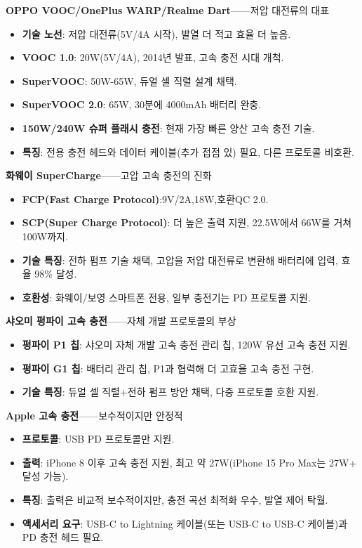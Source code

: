 \textbf{OPPO VOOC/OnePlus WARP/Realme Dart}——저압 대전류의 대표

\begin{itemize}
  \item \textbf{기술 노선}: 저압 대전류(5V/4A 시작), 발열 더 적고 효율 더 높음.
  \item \textbf{VOOC 1.0}: 20W(5V/4A), 2014년 발표, 고속 충전 시대 개척.
  \item \textbf{SuperVOOC}: 50W-65W, 듀얼 셀 직렬 설계 채택.
  \item \textbf{SuperVOOC 2.0}: 65W, 30분에 4000mAh 배터리 완충.
  \item \textbf{150W/240W 슈퍼 플래시 충전}: 현재 가장 빠른 양산 고속 충전 기술.
  \item \textbf{특징}: 전용 충전 헤드와 데이터 케이블(추가 접점 있) 필요, 다른 프로토콜 비호환.
\end{itemize}

\textbf{화웨이 SuperCharge}——고압 고속 충전의 진화

\begin{itemize}
  \item \textbf{FCP(Fast Charge Protocol)}:9V/2A,18W,호환QC 2.0.
  \item \textbf{SCP(Super Charge Protocol)}: 더 높은 출력 지원, 22.5W에서 66W를 거쳐 100W까지.
  \item \textbf{기술 특징}: 전하 펌프 기술 채택, 고압을 저압 대전류로 변환해 배터리에 입력, 효율 98\% 달성.
  \item \textbf{호환성}: 화웨이/보영 스마트폰 전용, 일부 충전기는 PD 프로토콜 지원.
\end{itemize}

\textbf{샤오미 펑파이 고속 충전}——자체 개발 프로토콜의 부상

\begin{itemize}
  \item \textbf{펑파이 P1 칩}: 샤오미 자체 개발 고속 충전 관리 칩, 120W 유선 고속 충전 지원.
  \item \textbf{펑파이 G1 칩}: 배터리 관리 칩, P1과 협력해 더 고효율 고속 충전 구현.
  \item \textbf{기술 특징}: 듀얼 셀 직렬+전하 펌프 방안 채택, 다중 프로토콜 호환 지원.
\end{itemize}

\textbf{Apple 고속 충전}——보수적이지만 안정적

\begin{itemize}
  \item \textbf{프로토콜}: USB PD 프로토콜만 지원.
  \item \textbf{출력}: iPhone 8 이후 고속 충전 지원, 최고 약 27W(iPhone 15 Pro Max는 27W+ 달성 가능).
  \item \textbf{특징}: 출력은 비교적 보수적이지만, 충전 곡선 최적화 우수, 발열 제어 탁월.
  \item \textbf{액세서리 요구}: USB-C to Lightning 케이블(또는 USB-C to USB-C 케이블)과 PD 충전 헤드 필요.
\end{itemize}

